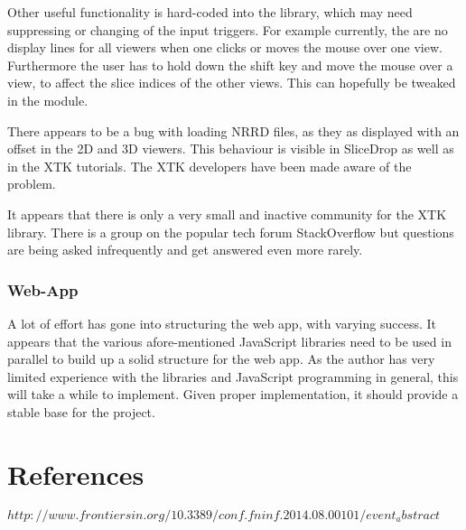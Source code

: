 \documentclass[a4paper,11pt,titlepage]{article}
\begin{document}
Other useful functionality is hard-coded into the library, which may need suppressing or changing of the input triggers. For example currently, the are no display lines for all viewers when one clicks or moves the mouse over one view. Furthermore the user has to hold down the shift key and move the mouse over a view, to affect the slice indices of the other views. This can hopefully be tweaked in the module.

There appears to be a bug with loading NRRD files, as they as displayed with an offset in the 2D and 3D viewers. This behaviour is visible in SliceDrop as well as in the XTK tutorials. The XTK developers have been made aware of the problem.

It appears that there is only a very small and inactive community for the XTK library. There is a group on the popular tech forum StackOverflow but questions are being asked infrequently and get answered even more rarely. 

\subsubsection{Web-App}

A lot of effort has gone into structuring the web app, with varying success. It appears that the various afore-mentioned JavaScript libraries need to be used in parallel to build up a solid structure for the web app. As the author has very limited experience with the libraries and JavaScript programming in general, this will take a while to implement. Given proper implementation, it should provide a stable base for the project.





\section{References}

$http://www.frontiersin.org/10.3389/conf.fninf.2014.08.00101/event_abstract$
\end{document}
